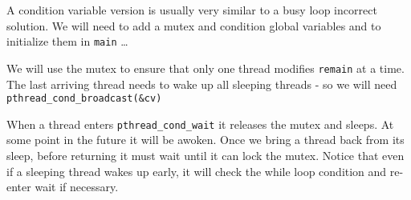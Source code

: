 A condition variable version is usually very similar to a busy loop
incorrect solution. We will need to add a mutex and condition global
variables and to initialize them in \texttt{main} \ldots{}

\begin{Shaded}
\begin{Highlighting}[]

\end{Highlighting}
\end{Shaded}

We will use the mutex to ensure that only one thread modifies
\texttt{remain} at a time.\\The last arriving thread needs to wake up
all sleeping threads - so we will need
\texttt{pthread\_cond\_broadcast(\&cv)}

\begin{Shaded}
\begin{Highlighting}[]
 
 \NormalTok{\{}
\NormalTok{\}}
\end{Highlighting}
\end{Shaded}

When a thread enters \texttt{pthread\_cond\_wait} it releases the mutex
and sleeps. At some point in the future it will be awoken. Once we bring
a thread back from its sleep, before returning it must wait until it can
lock the mutex. Notice that even if a sleeping thread wakes up early, it
will check the while loop condition and re-enter wait if necessary.
